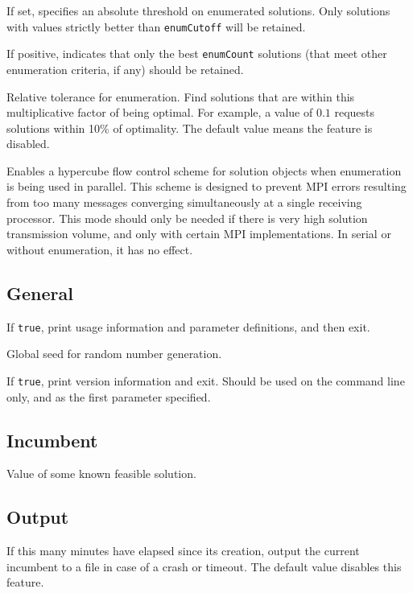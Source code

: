 If set, specifies an absolute threshold on enumerated solutions.  Only
solutions with values strictly better than \texttt{enumCutoff} will be
retained. 

        If positive, indicates that only the best \texttt{enumCount}
        solutions (that meet other enumeration criteria, if any)
        should be retained. 

        Relative tolerance for enumeration.  Find solutions
        that are within this multiplicative factor of being
        optimal.  For example, a value of $0.1$ requests solutions
        within 10\% of optimality.  The default value means the
        feature is disabled.

Enables a hypercube flow control scheme for solution objects when enumeration
is being used in parallel.  This scheme is designed to prevent MPI errors
resulting from too many messages converging simultaneously at a single
receiving processor.  This mode should only be needed if there is very high
solution transmission volume, and only with certain MPI implementations.  In
serial or without enumeration, it has no effect.


\subsection{General}
\vspace{-3ex}
If \texttt{true}, print usage information and parameter definitions, and then exit.

Global seed for random number generation.

If \texttt{true}, print version information and exit. Should be used  on
the command line only, and as the first parameter specified.


\subsection{Incumbent}
\vspace{-3ex}
Value of some known feasible solution.

\subsection{Output}
\label{sec:outputparams}
\vspace{-3ex}
If this many minutes have elapsed since its creation,
output the current incumbent to a file in case of
a crash or timeout.  The default value disables this
feature.

